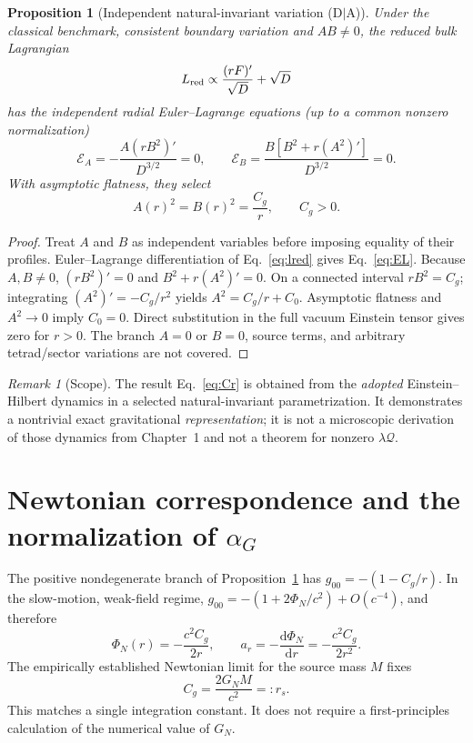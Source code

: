 \documentclass[11pt,a4paper]{article}
\newtheorem{proposition}[theorem]{Proposition}
\theoremstyle{remark}
\newtheorem{remark}[theorem]{Remark}
\newcommand{\dd}{\mathrm d}
\newcommand{\eref}[1]{Eq.~\eqref{#1}}
\begin{document}
\begin{proposition}[Independent natural-invariant variation (D$\mid$A)]\label{prop:vacuum}
Under the classical benchmark, consistent boundary variation and $AB\ne0$, the reduced bulk Lagrangian
\begin{equation}\label{eq:lred}
 L_{\rm red}\propto \frac{(rF)'}{\sqrt D}+\sqrt D
\end{equation}
has the independent radial Euler--Lagrange equations (up to a common nonzero normalization)
\begin{equation}\label{eq:EL}
\boxed{\mathcal E_A=-\frac{A(rB^2)'}{D^{3/2}}=0,\qquad
\mathcal E_B=\frac{B\left[B^2+r(A^2)'\right]}{D^{3/2}}=0.}
\end{equation}
With asymptotic flatness, they select
\begin{equation}\label{eq:Cr}
\boxed{A(r)^2=B(r)^2=\frac{C_g}{r},\qquad C_g>0.}
\end{equation}
\end{proposition}
\begin{proof}
Treat $A$ and $B$ as independent variables before imposing equality of their profiles. Euler--Lagrange differentiation of \eref{eq:lred} gives \eref{eq:EL}. Because $A,B\ne0$, $(rB^2)'=0$ and $B^2+r(A^2)'=0$. On a connected interval $rB^2=C_g$; integrating $(A^2)'=-C_g/r^2$ yields $A^2=C_g/r+C_0$. Asymptotic flatness and $A^2\to0$ imply $C_0=0$. Direct substitution in the full vacuum Einstein tensor gives zero for $r>0$. The branch $A=0$ or $B=0$, source terms, and arbitrary tetrad/sector variations are not covered.
\end{proof}

\begin{remark}[Scope]
The result \eref{eq:Cr} is obtained from the \emph{adopted} Einstein--Hilbert dynamics in a selected natural-invariant parametrization. It demonstrates a nontrivial exact gravitational \emph{representation}; it is not a microscopic derivation of those dynamics from Chapter~1 and not a theorem for nonzero $\lambda\mathcal Q$.
\end{remark}

\section{Newtonian correspondence and the normalization of \texorpdfstring{$\alpha_G$}{alpha G}}\label{sec:newton}
The positive nondegenerate branch of Proposition~\ref{prop:vacuum} has
$g_{00}=-(1-C_g/r)$. In the slow-motion, weak-field regime,
$g_{00}=-(1+2\Phi_N/c^2)+O(c^{-4})$, and therefore
\begin{equation}\label{eq:newtonforce}
 \Phi_N(r)=-\frac{c^2C_g}{2r},\qquad
 a_r=-\frac{\dd\Phi_N}{\dd r}=-\frac{c^2C_g}{2r^2}.
\end{equation}
The empirically established Newtonian limit for the source mass $M$ fixes
\begin{equation}\label{eq:Cg}
 \boxed{C_g=\frac{2G_NM}{c^2}=:r_s.}
\end{equation}
This matches a single integration constant. It does not require a
first-principles calculation of the numerical value of $G_N$.
\end{document}
